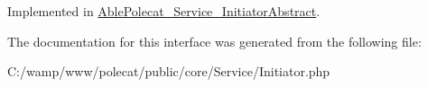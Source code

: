 Implemented in \hyperlink{class_able_polecat___service___initiator_abstract_a66e49cc03d1511ec4c0290ffaa688079}{Able\+Polecat\+\_\+\+Service\+\_\+\+Initiator\+Abstract}.



The documentation for this interface was generated from the following file\+:\begin{DoxyCompactItemize}
\item 
C\+:/wamp/www/polecat/public/core/\+Service/Initiator.\+php\end{DoxyCompactItemize}
